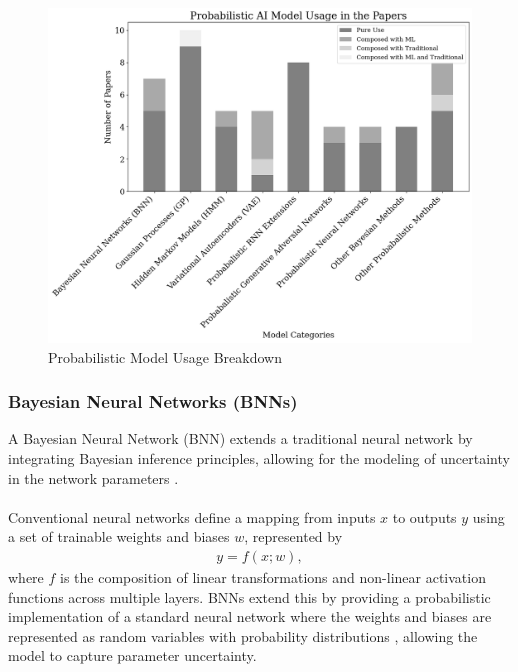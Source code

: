 \begin{figure}[H]
    \centering
    \includegraphics[width=1\linewidth]{Images/model_breakdown.png}
    \caption{Probabilistic Model Usage Breakdown}
    \label{fig:model_breakdown}
\end{figure}


\subsubsection{Bayesian Neural Networks (BNNs)}
\label{sec:bnn}

A Bayesian Neural Network (BNN) extends a traditional neural network by integrating Bayesian inference principles, allowing for the modeling of uncertainty in the network parameters \parencite{neal1995bayesian}. 
\\
\\
Conventional neural networks define a mapping from inputs $x$ to outputs $y$ using a set of trainable weights and biases $w$, represented by
\begin{equation}
    \begin{gathered}
        y = f(x;w),
    \end{gathered}
\end{equation}
where $f$ is the composition of linear transformations and non-linear activation functions across multiple layers. BNNs extend this by providing a probabilistic implementation of a standard neural network where the weights and biases are represented as random variables with probability distributions \parencite{chandra2023bayesian}, allowing the model to capture parameter uncertainty. 

